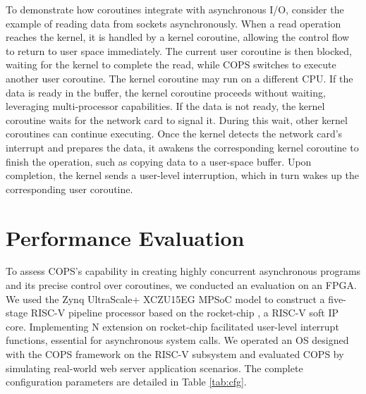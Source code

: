 \documentclass[conference]{IEEEtran}
\begin{document}
To demonstrate how coroutines integrate with asynchronous I/O, consider the example of reading data from sockets asynchronously. When a read operation reaches the kernel, it is handled by a kernel coroutine, allowing the control flow to return to user space immediately. The current user coroutine is then blocked, waiting for the kernel to complete the read, while COPS switches to execute another user coroutine. The kernel coroutine may run on a different CPU. If the data is ready in the buffer, the kernel coroutine proceeds without waiting, leveraging multi-processor capabilities. If the data is not ready, the kernel coroutine waits for the network card to signal it. During this wait, other kernel coroutines can continue executing. Once the kernel detects the network card's interrupt and prepares the data, it awakens the corresponding kernel coroutine to finish the operation, such as copying data to a user-space buffer. Upon completion, the kernel sends a user-level interruption, which in turn wakes up the corresponding user coroutine.

\section{Performance Evaluation}
\label{section: Performance Evaluation}

To assess COPS's capability in creating highly concurrent asynchronous programs and its precise control over coroutines, we conducted an evaluation on an FPGA. We used the Zynq UltraScale+ XCZU15EG MPSoC model \cite{zynq} to construct a five-stage RISC-V pipeline processor based on the rocket-chip \cite{rocket-chip}, a RISC-V soft IP core. Implementing N extension \cite{waterman_volume_nodate} on rocket-chip facilitated user-level interrupt functions, essential for asynchronous system calls. We operated an OS designed with the COPS framework on the RISC-V subsystem and evaluated COPS by simulating real-world web server application scenarios. The complete configuration parameters are detailed in Table \ref{tab:cfg}.
\end{document}
